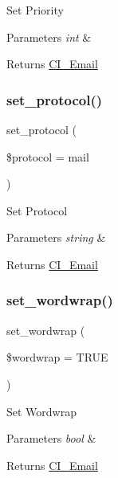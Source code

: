 Set Priority


\begin{DoxyParams}{Parameters}
{\em int} & \\
\hline
\end{DoxyParams}
\begin{DoxyReturn}{Returns}
\mbox{\hyperlink{class_c_i___email}{C\+I\+\_\+\+Email}} 
\end{DoxyReturn}
\mbox{\label{class_c_i___email_a7be40507898a21ce9172b225e973b107}} 
\subsubsection{\texorpdfstring{set\+\_\+protocol()}{set\_protocol()}}
{\footnotesize\ttfamily set\+\_\+protocol (\begin{DoxyParamCaption}\item[{}]{\$protocol = {\ttfamily \textquotesingle{}mail\textquotesingle{}} }\end{DoxyParamCaption})}

Set Protocol


\begin{DoxyParams}{Parameters}
{\em string} & \\
\hline
\end{DoxyParams}
\begin{DoxyReturn}{Returns}
\mbox{\hyperlink{class_c_i___email}{C\+I\+\_\+\+Email}} 
\end{DoxyReturn}
\mbox{\label{class_c_i___email_a6abb8d5f17213eba1e243ca633da8084}} 
\subsubsection{\texorpdfstring{set\+\_\+wordwrap()}{set\_wordwrap()}}
{\footnotesize\ttfamily set\+\_\+wordwrap (\begin{DoxyParamCaption}\item[{}]{\$wordwrap = {\ttfamily TRUE} }\end{DoxyParamCaption})}

Set Wordwrap


\begin{DoxyParams}{Parameters}
{\em bool} & \\
\hline
\end{DoxyParams}
\begin{DoxyReturn}{Returns}
\mbox{\hyperlink{class_c_i___email}{C\+I\+\_\+\+Email}} 
\end{DoxyReturn}
\mbox{\label{class_c_i___email_a4c29a687d4ed62c26a10e41d98930d5f}} 
